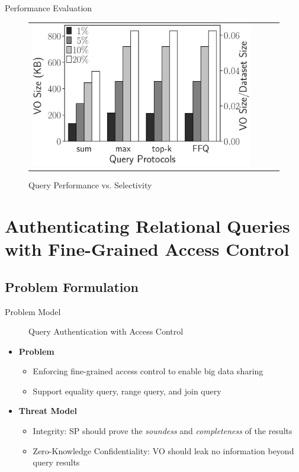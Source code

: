 \documentclass[xcolor={dvipsnames},aspectratio=169,10pt]{beamer}
\begin{document}
\begin{frame}{Performance Evaluation}
\begin{figure}
\begin{tabular}{c@{\quad}lll}
      \includegraphics[valign=m,totalheight=\ht\figbox]{exp-figs/aggregate-queries/tpch_vo.eps}
    \end{tabular}
    \caption{Query Performance vs. Selectivity}
  \end{figure}
\end{frame}

\section{Authenticating Relational Queries with Fine-Grained Access Control}

\subsection{Problem Formulation}

\begin{frame}{Problem Model}
  \begin{figure}
    \centering
    \resizebox{.75\linewidth}{!}{}
    \caption{Query Authentication with Access Control}
  \end{figure}

  \begin{itemize}[<+->]
    \item \textbf{Problem}
      \begin{itemize}[<1->]
        \item Enforcing \alert{fine-grained access control} to enable big data sharing
        \item Support \alert{equality query}, \alert{range query}, and \alert{join query}
      \end{itemize}
    \item \textbf{Threat Model}
      \begin{itemize}[<1->]
        \item \alert{Integrity}: SP should prove the \emph{soundess} and \emph{completeness} of the results
        \item \alert{Zero-Knowledge Confidentiality}: VO should leak no information beyond query results
      \end{itemize}
  \end{itemize}
\end{frame}
\end{document}
